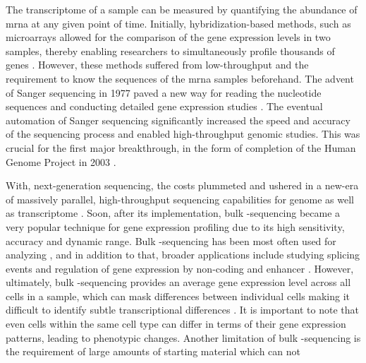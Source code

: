\par The transcriptome of a sample can be measured by quantifying the abundance of \gls{mrna} at any given point of time. Initially, hybridization-based methods, such as microarrays allowed for the comparison of the gene expression levels in two samples, thereby enabling researchers to simultaneously profile thousands of genes \textbf{\cite{lockhart_expression_1996,schena_quantitative_1995}}. However, these methods suffered from low-throughput and the requirement to know the sequences of the \gls{mrna} samples beforehand. The advent of Sanger sequencing in 1977 paved a new way for reading the nucleotide sequences and conducting detailed gene expression studies \textbf{\cite{sanger_dna_1977}}. The eventual automation of Sanger sequencing significantly increased the speed and accuracy of the sequencing process and enabled high-throughput genomic studies. This was crucial for the first major breakthrough, in the form of completion of the Human Genome Project in 2003 \textbf{\cite{collins_human_2003}}.\\

\par With, next-generation sequencing, the costs plummeted and ushered in a new-era of massively parallel, high-throughput sequencing capabilities for genome as well as transcriptome \textbf{\cite{voelkerding_next-generation_2009}}. Soon, after its implementation, bulk -sequencing became a very popular technique for gene expression profiling due to its high sensitivity, accuracy and dynamic range. Bulk -sequencing has been most often used for analyzing , and in addition to that, broader applications include studying splicing events and regulation of gene expression by non-coding and enhancer  \textbf{\cite{stark_rna_2019}}. However, ultimately, bulk -sequencing provides an average gene expression level across all cells in a sample, which can mask differences between individual cells making it difficult to identify subtle transcriptional differences \textbf{\cite{kalisky_brief_2018}}. It is important to note that even cells within the same cell type can differ in terms of their gene expression patterns, leading to phenotypic changes. Another limitation of bulk -sequencing is the requirement of large amounts of starting material which can not 


